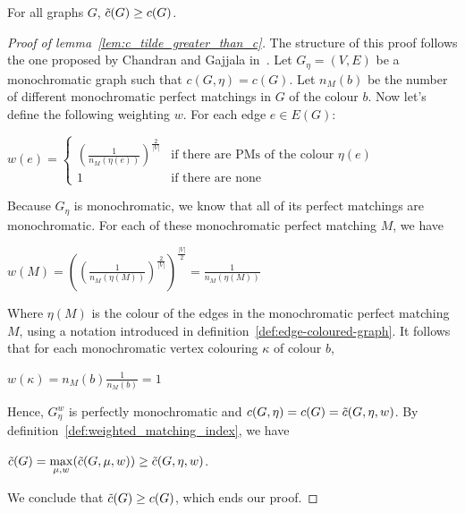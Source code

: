 \begin{lemma}
    \label{lem:c_tilde_greater_than_c}
    For all graphs $G$, $\Tilde{c}(G) \geq c(G)$.
\end{lemma}

\begin{proof}[Proof of lemma~\ref{lem:c_tilde_greater_than_c}]
    The structure of this proof follows the one proposed by Chandran and Gajjala in~\cite{chandran}.
    Let $G_\eta = (V, E)$ be a monochromatic graph such that $c(G, \eta) = c(G)$.
    Let $n_{M}(b)$ be the number of different monochromatic perfect matchings in $G$ of the colour $b$.
    Now let's define the following weighting $w$.
    For each edge $e \in E(G)$:
    
    \begin{center}
        $w(e) = \left\{
        \begin{array}{ll}
            \left(\frac{1}{n_{M}(\eta(e))}\right)^{\frac{2}{|V|}} & \mbox{if there are PMs of the colour } \eta(e) \\
            1 & \mbox{if there are none}
        \end{array}
        \right.$
    \end{center}

    Because $G_\eta$ is monochromatic, we know that all of its perfect matchings are monochromatic.
    For each of these monochromatic perfect matching $M$, we have
    
    \begin{center}
        $w(M) = \left( \left(\frac{1}{n_{M}(\eta(M))}\right)^{\frac{2}{|V|}}\right)^{\frac{|V|}{2}} = \frac{1}{n_{M}(\eta(M))}$
    \end{center}

    Where $\eta(M)$ is the colour of the edges in the monochromatic perfect matching $M$, using a notation introduced in definition~\ref{def:edge-coloured-graph}.
    It follows that for each monochromatic vertex colouring $\kappa$ of colour $b$,
    
    \begin{center}
        $w(\kappa) = n_{M}(b)\frac{1}{n_{M}(b)} = 1$
    \end{center}
    
    Hence, $G_\eta^w$ is perfectly monochromatic and $c(G, \eta) = c(G) = \Tilde{c}(G, \eta, w)$.
    By definition~\ref{def:weighted_matching_index}, we have
    \begin{center}
        $\Tilde{c}(G) = \max\limits_{\mu, w}(\Tilde{c}(G, \mu, w)) \geq \Tilde{c}(G, \eta, w)$.
    \end{center}
    We conclude that $\Tilde{c}(G) \geq c(G)$, which ends our proof.
\end{proof}

